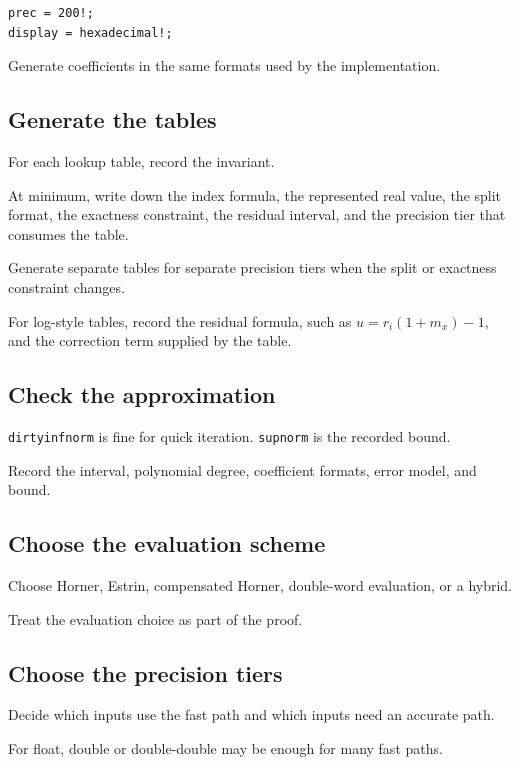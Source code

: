\documentclass[manuscript, nonacm]{acmart}
\begin{document}
    \begin{lstlisting}[style=sollya]
prec = 200!;
display = hexadecimal!;
    \end{lstlisting}

    Generate coefficients in the same formats used by the implementation.

    \subsection{Generate the tables}

    For each lookup table, record the invariant.

    At minimum, write down the index formula, the represented real value, the
    split format, the exactness constraint, the residual interval, and the
    precision tier that consumes the table.

    Generate separate tables for separate precision tiers when the split or
    exactness constraint changes.

    For log-style tables, record the residual formula, such as
    $u = r_i(1 + m_x) - 1$, and the correction term supplied by the table.

    \subsection{Check the approximation}

    \texttt{dirtyinfnorm} is fine for quick iteration.  \texttt{supnorm} is the
    recorded bound.

    Record the interval, polynomial degree, coefficient formats, error model,
    and bound.

    \subsection{Choose the evaluation scheme}

    Choose Horner, Estrin, compensated Horner, double-word evaluation, or a
    hybrid.

    Treat the evaluation choice as part of the proof.

    \subsection{Choose the precision tiers}

    Decide which inputs use the fast path and which inputs need an accurate path.

    For float, double or double-double may be enough for many fast paths.
\end{document}
